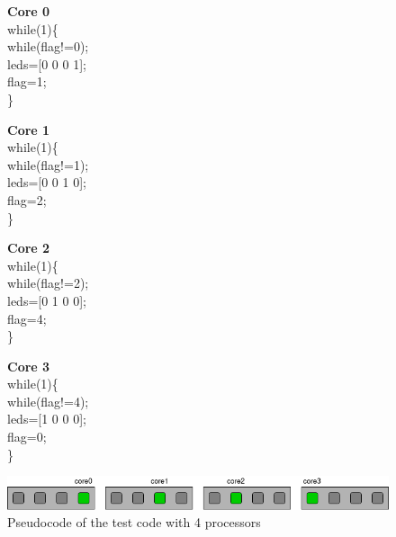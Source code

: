 \begin{figure}[htbp]
\centering
\begin{minipage}[t][3cm][t]{3cm}
\textbf{Core 0}\\
while(1)\{\\
\hspace*{.4cm}while(flag!=0);\\
\hspace*{.4cm}leds=[0 0 0 1];\\
\hspace*{.4cm}flag=1;\\
\}
\end{minipage}\hspace{.5cm}
\begin{minipage}[t][3cm][t]{3cm}
\textbf{Core 1}\\
while(1)\{\\
\hspace*{.4cm}while(flag!=1);\\
\hspace*{.4cm}leds=[0 0 1 0];\\
\hspace*{.4cm}flag=2;\\
\}
\end{minipage}\hspace{.5cm}
\begin{minipage}[t][3cm][t]{3cm}
\textbf{Core 2}\\
while(1)\{\\
\hspace*{.4cm}while(flag!=2);\\
\hspace*{.4cm}leds=[0 1 0 0];\\
\hspace*{.4cm}flag=4;\\
\}
\end{minipage}\hspace{.5cm}
\begin{minipage}[t][3cm][t]{3cm}
\textbf{Core 3}\\
while(1)\{\\
\hspace*{.4cm}while(flag!=4);\\
\hspace*{.4cm}leds=[1 0 0 0];\\
\hspace*{.4cm}flag=0;\\
\}
\end{minipage}
\includegraphics[width=.72\textwidth]{images/leds4_fig.png}
\caption{Pseudocode of the test code with 4 processors}
\label{4led-code}
\end{figure}


